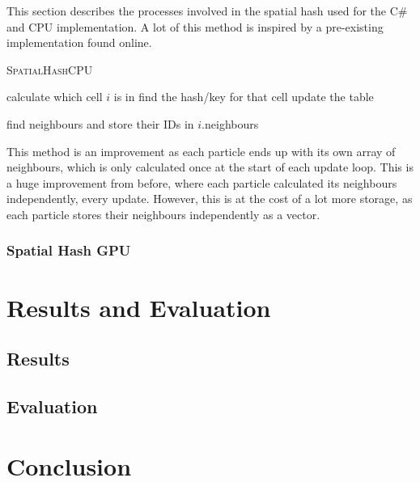 \documentclass[12pt]{article}
\begin{document}
    This section describes the processes involved in the spatial hash used for the C\# and CPU implementation. A lot of this method is inspired by a pre-existing implementation found online\cite{sphspatialexample}.

    \begin{algorithm}[H]
        \caption{\textsc{SpatialHashCPU}}
    
        \begin{algorithmic}
                \State calculate which cell $i$ is in
                \State find the hash/key for that cell
                \State update the table
            \EndFor

                \State find neighbours and store their IDs in $i$.neighbours
            \EndFor
        \end{algorithmic}
    \end{algorithm}

    This method is an improvement as each particle ends up with its own array of neighbours, which is only calculated once at the start of each update loop. This is a huge improvement from before, where each particle calculated its neighbours independently, every update. However, this is at the cost of a lot more storage, as each particle stores their neighbours independently as a vector.

    \subsubsection{Spatial Hash GPU}
    
    \newpage

    \section{Results and Evaluation}
    \label{sec:resultsandevaluation}
    \subsection{Results}
    \subsection{Evaluation}

    \newpage

    \section{Conclusion}
    \label{sec:conclusion}
\end{document}

